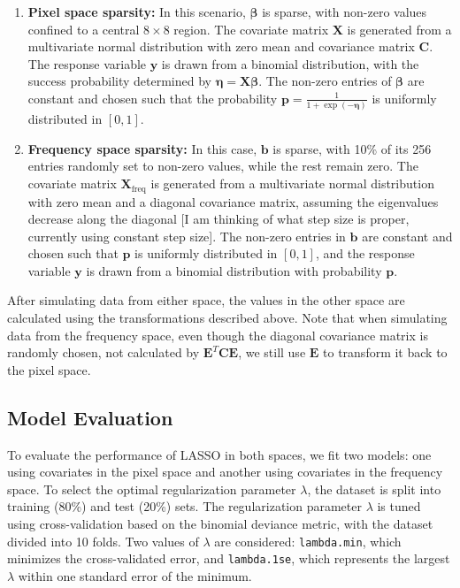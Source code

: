 \documentclass[12pt]{article}
\begin{document}
\begin{enumerate}
  \item \textbf{Pixel space sparsity:} In this scenario, \( \boldsymbol{\beta} \) is sparse, with non-zero values confined to a central \( 8 \times 8 \) region. The covariate matrix \( \mathbf{X} \) is generated from a multivariate normal distribution with zero mean and covariance matrix \( \mathbf{C} \). The response variable \( \mathbf{y} \) is drawn from a binomial distribution, with the success probability determined by \( \boldsymbol{\eta} = \mathbf{X} \boldsymbol{\beta} \). The non-zero entries of \( \boldsymbol{\beta} \) are constant and chosen such that the probability \( \mathbf{p} = \frac{1}{1 + \exp(-\boldsymbol{\eta})} \) is uniformly distributed in \( [0, 1] \).
  \item \textbf{Frequency space sparsity:} In this case, \( \mathbf{b} \) is sparse, with 10\% of its 256 entries randomly set to non-zero values, while the rest remain zero. The covariate matrix \( \mathbf{X}_{\mathrm{freq}} \) is generated from a multivariate normal distribution with zero mean and a diagonal covariance matrix, assuming the eigenvalues decrease along the diagonal [I am thinking of what step size is proper, currently using constant step size]. The non-zero entries in \( \mathbf{b} \) are constant and chosen such that \( \mathbf{p} \) is uniformly distributed in \( [0, 1] \), and the response variable \( \mathbf{y} \) is drawn from a binomial distribution with probability \( \mathbf{p} \).
\end{enumerate}

After simulating data from either space, the values in the other space are calculated using the transformations described above. Note that when simulating data from the frequency space, even though the diagonal covariance matrix is randomly chosen, not calculated by \( \mathbf{E}^T \mathbf{C} \mathbf{E} \), we still use \( \mathbf{E} \) to transform it back to the pixel space.

\subsection*{Model Evaluation}

To evaluate the performance of LASSO in both spaces, we fit two models: one using covariates in the pixel space and another using covariates in the frequency space. To select the optimal regularization parameter \( \lambda \), the dataset is split into training (80\%) and test (20\%) sets. The regularization parameter \( \lambda \) is tuned using cross-validation based on the binomial deviance metric, with the dataset divided into 10 folds. Two values of \( \lambda \) are considered: \texttt{lambda.min}, which minimizes the cross-validated error, and \texttt{lambda.1se}, which represents the largest \( \lambda \) within one standard error of the minimum.
\end{document}
